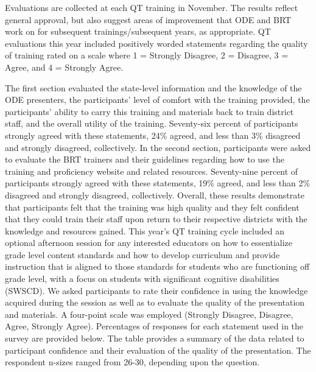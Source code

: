 \documentclass[]{article}
\begin{document}
Evaluations are collected at each QT training in November. The results
reflect general approval, but also suggest areas of improvement that ODE
and BRT work on for subsequent trainings/subsequent years, as
appropriate. QT evaluations this year included positively worded
statements regarding the quality of training rated on a scale where 1 =
Strongly Disagree, 2 = Disagree, 3 = Agree, and 4 = Strongly Agree.

The first section evaluated the state-level information and the
knowledge of the ODE presenters, the participants' level of comfort with
the training provided, the participants' ability to carry this training
and materials back to train district staff, and the overall utility of
the training. Seventy-six percent of participants strongly agreed with
these statements, 24\% agreed, and less than 3\% disagreed and strongly
disagreed, collectively. In the second section, participants were asked
to evaluate the BRT trainers and their guidelines regarding how to use
the training and proficiency website and related resources. Seventy-nine
percent of participants strongly agreed with these statements, 19\%
agreed, and less than 2\% disagreed and strongly disagreed,
collectively. Overall, these results demonstrate that participants felt
that the training was high quality and they felt confident that they
could train their staff upon return to their respective districts with
the knowledge and resources gained. This year's QT training cycle
included an optional afternoon session for any interested educators on
how to essentialize grade level content standards and how to develop
curriculum and provide instruction that is aligned to those standards
for students who are functioning off grade level, with a focus on
students with significant cognitive disabilities (SWSCD). We asked
participants to rate their confidence in using the knowledge acquired
during the session as well as to evaluate the quality of the
presentation and materials. A four-point scale was employed (Strongly
Disagree, Disagree, Agree, Strongly Agree). Percentages of responses for
each statement used in the survey are provided below. The table provides
a summary of the data related to participant confidence and their
evaluation of the quality of the presentation. The respondent n-sizes
ranged from 26-30, depending upon the question.
\end{document}
